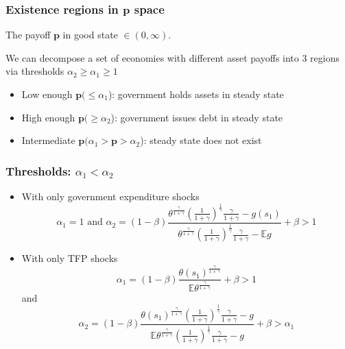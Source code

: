\documentclass{beamer}
\newcommand{\EE}{\mathbb E}
\begin{document}
\begin{frame}
\frametitle{Existence regions in $\bm{p}$ space}

The payoff $\bm{p}$ in good state
$\in (0,\infty)$.

We can decompose a set of economies with different asset payoffs into 3 regions via thresholds $\alpha_2\geq\alpha_1\geq1$



  \begin{itemize}
   \item Low enough $\bm{p}(\leq \alpha_1$): government holds assets in steady state
   \item High enough $\bm{p} (\geq \alpha_2$): government  issues debt  in steady state
   \item Intermediate $\bm{p} (\alpha_1>\bm{p}>\alpha_2$): steady state does not exist
  \end{itemize}

 \end{frame}




\begin{frame}
 \frametitle{Thresholds: $\alpha_1 <\alpha_2$}
	\begin{itemize}
		\item With only government expenditure shocks
		\[
			\alpha_1 = 1 \text{  and }  \alpha_2 = (1-\beta)\frac{\theta^\frac{\gamma}{1+\gamma}\left(\frac{1}{1+\gamma}\right)^\frac1\gamma\frac{\gamma}{1+\gamma}-g(s_1)}{\theta^\frac{\gamma}{1+\gamma}\left(\frac{1}{1+\gamma}\right)^\frac1\gamma\frac{\gamma}{1+\gamma}-\EE g} +\beta>1
		\]
		\item With only TFP shocks
		\[
			\alpha_1 = (1-\beta)\frac{\theta(s_1)^\frac{\gamma}{1+\gamma}}{\EE\theta^\frac{\gamma}{1+\gamma}}+\beta > 1
		\]and
		\[
		\alpha_2 = (1-\beta)\frac{\theta(s_1)^\frac{\gamma}{1+\gamma}\left(\frac{1}{1+\gamma}\right)^\frac1\gamma\frac{\gamma}{1+\gamma}-g}{\EE\theta^\frac{\gamma}{1+\gamma}\left(\frac{1}{1+\gamma}\right)^\frac1\gamma\frac{\gamma}{1+\gamma}-g}+\beta>\alpha_1
		\]
	\end{itemize}
 \end{frame}
\end{document}
